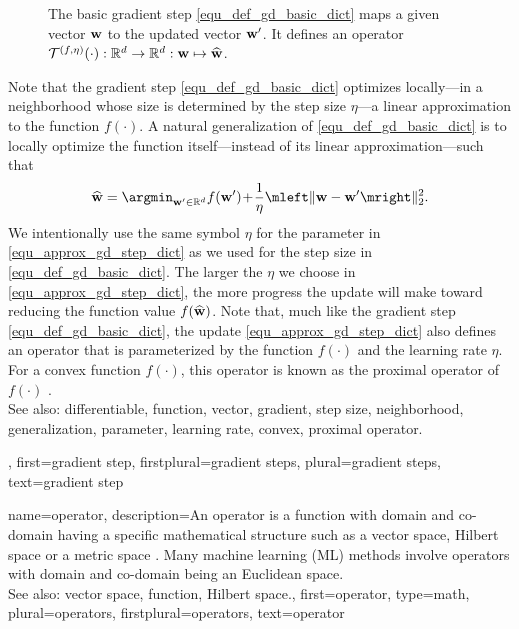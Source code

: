 {{{\begin{figure}[H]
\begin{center}
			\end{center}
			\caption{The basic gradient step \eqref{equ_def_gd_basic_dict} maps a given vector ${\bf w}$ 
			to the updated vector ${\bf w}'$. It defines an operator 
			$\mathcal{T}^{(f,\eta)}(\cdot): \mathbb{R}^{d} \rightarrow \mathbb{R}^{d}:
			 {\bf w} \mapsto \widehat{{\bf w}}$.}
			\label{fig_basic_GD_step_single_dict}
		\end{figure}
		Note that the gradient step \eqref{equ_def_gd_basic_dict} optimizes locally—in a neighborhood whose size is 
		determined by the step size $\eta$—a linear approximation 
		to the function $f(\cdot)$. A natural generalization of \eqref{equ_def_gd_basic_dict} is to locally 
		optimize the function itself—instead of its linear approximation—such that
		\begin{align} 
		\label{equ_approx_gd_step_dict}
		\widehat{{\bf w}} = \argmin_{{\bf w}' \in \mathbb{R}^{d}} f({\bf w}')\!+\!\frac{1}{\eta}\mleft\lVert {\bf w}-{\bf w}' \mright\rVert_{2}^2. 
		\end{align}
		We intentionally use the same symbol $\eta$ for the parameter in \eqref{equ_approx_gd_step_dict} 
		as we used for the step size in \eqref{equ_def_gd_basic_dict}. The larger the $\eta$ we choose in 
		\eqref{equ_approx_gd_step_dict}, the more progress the update will make toward reducing the 
		function value $f(\widehat{{\bf w}})$. Note that, much like the gradient step \eqref{equ_def_gd_basic_dict}, 
		the update \eqref{equ_approx_gd_step_dict} also defines an operator 
		that is parameterized by the function $f(\cdot)$ and the learning rate $\eta$. For a convex function  
		$f(\cdot)$, this operator is known as the proximal operator of $f(\cdot)$ \cite{ProximalMethods}. 
					\\ 
		See also: differentiable, function, vector, gradient, step size, neighborhood, generalization, parameter, learning rate, convex, proximal operator.},
	first={gradient step},
	firstplural={gradient steps},
	plural={gradient steps},
	text={gradient step}
}

{name={operator}, 
	description={An operator is a function 
	          with domain and co-domain having a specific 
			  mathematical structure such as a vector space, Hilbert space
			  or a metric space \cite{Bauschke:2017,DunfordSchwartz1988}. 
			  Many machine learning (ML) methods involve operators with domain and co-domain 
			  being an Euclidean space.
							\\ 
		See also: vector space, function, Hilbert space.},
	first={operator},
	type=math, 
	plural={operators},
	firstplural={operators},
	text={operator}
}

}
